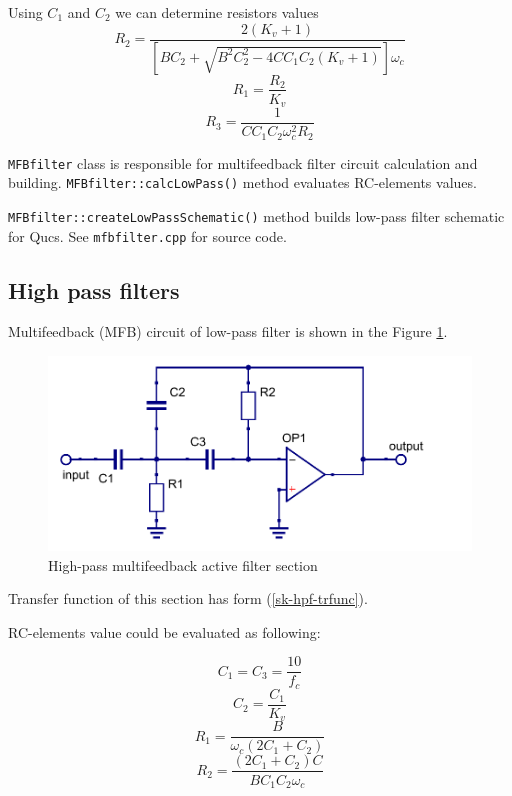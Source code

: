Using $C_1$ and $C_2$ we can determine resistors values
\begin{equation}
 R_2=\frac{2(K_v+1)}{[BC_2+\sqrt{B^2C_2^2-4CC_1C_2(K_v+1)}]\omega_c}
\end{equation}
\begin{equation}
 R_1=\frac{R_2}{K_v}
\end{equation}
\begin{equation}
 R_3=\frac{1}{CC_1C_2\omega_c^2R_2}
\end{equation}

\verb|MFBfilter| class is responsible for multifeedback filter circuit
calculation and building. \verb|MFBfilter::calcLowPass()| method evaluates
RC-elements values. 

\verb|MFBfilter::createLowPassSchematic()| method builds
low-pass filter schematic for Qucs. See \verb|mfbfilter.cpp| for source code.




\subsection{High pass filters}

Multifeedback (MFB) circuit of low-pass filter is shown in the Figure
\ref{fig:mfb-hpf}. 

\begin{figure}[!ht]
  \centering
  \includegraphics[width=0.6\linewidth]{pics/mfb-hpf}
  \caption{High-pass multifeedback active filter section}
  \label{fig:mfb-hpf}
\end{figure}

Transfer function of this section has form (\ref{sk-hpf-trfunc}). 

RC-elements value could be evaluated as following:

\begin{equation}
 C_1=C_3=\frac{10}{f_c}
\end{equation}
\begin{equation}
 C_2=\frac{C_1}{K_v}
\end{equation}
\begin{equation}
 R_1=\frac{B}{\omega_c(2C_1+C_2)}
\end{equation}
\begin{equation}
 R_2=\frac{(2C_1+C_2)C}{BC_1C_2\omega_c}
\end{equation}

